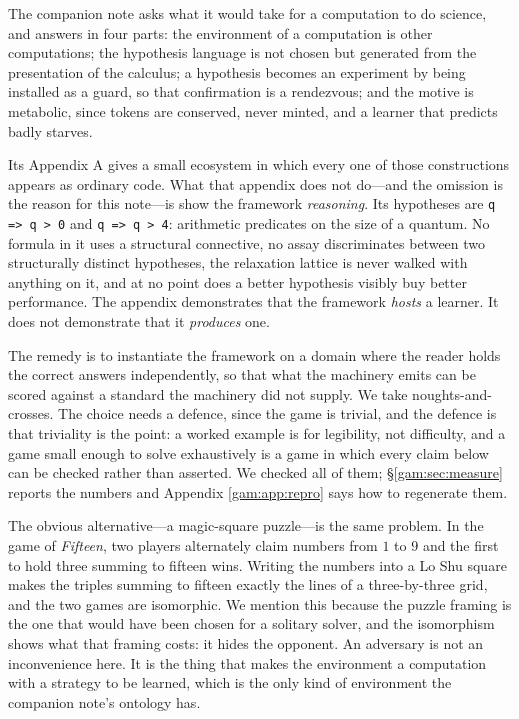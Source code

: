 The companion note \chSci asks what it would take for a computation to
do science, and answers in four parts: the environment of a computation is other
computations; the hypothesis language is not chosen but generated from the
presentation of the calculus; a hypothesis becomes an experiment by being
installed as a guard, so that confirmation is a rendezvous; and the motive is
metabolic, since tokens are conserved, never minted, and a learner that predicts
badly starves.

Its Appendix A gives a small ecosystem in which every one of those constructions
appears as ordinary code. What that appendix does not do---and the omission is
the reason for this note---is show the framework \emph{reasoning}. Its
hypotheses are \texttt{q => q > 0} and \texttt{q => q > 4}: arithmetic
predicates on the size of a quantum. No formula in it uses a structural
connective, no assay discriminates between two structurally distinct
hypotheses, the relaxation lattice is never walked with anything on it, and at
no point does a better hypothesis visibly buy better performance. The appendix
demonstrates that the framework \emph{hosts} a learner. It does not demonstrate
that it \emph{produces} one.

The remedy is to instantiate the framework on a domain where the reader holds
the correct answers independently, so that what the machinery emits can be
scored against a standard the machinery did not supply. We take
noughts-and-crosses. The choice needs a defence, since the game is trivial, and
the defence is that triviality is the point: a worked example is for legibility,
not difficulty, and a game small enough to solve exhaustively is a game in which
every claim below can be checked rather than asserted. We checked all of them;
\S\ref{gam:sec:measure} reports the numbers and Appendix \ref{gam:app:repro} says how to
regenerate them.

\begin{remark}\label{gam:magic-square-comes-free}
The obvious alternative---a magic-square puzzle---is the same problem. In the
game of \emph{Fifteen}, two players alternately claim numbers from $1$ to $9$
and the first to hold three summing to fifteen wins. Writing the numbers into a
Lo Shu square makes the triples summing to fifteen exactly the lines of a
three-by-three grid, and the two games are isomorphic. We mention this because
the puzzle framing is the one that would have been chosen for a solitary
solver, and the isomorphism shows what that framing costs: it hides the
opponent. An adversary is not an inconvenience here. It is the thing that makes
the environment a computation with a strategy to be learned, which is the only
kind of environment the companion note's ontology has.
\end{remark}

